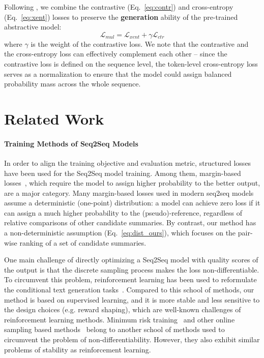\documentclass[11pt]{article}
\begin{document}
Following \citet{edunov-etal-2018-classical}, we combine the contrastive (Eq.~\ref{eq:contr}) and cross-entropy (Eq.~\ref{eq:xent}) losses to preserve the \textbf{generation} ability of the pre-trained abstractive model: 
\begin{equation}
\label{eq:mul}
    \mathcal{L}_{mul} = \mathcal{L}_{xent} + \gamma \mathcal{L}_{ctr}
\end{equation}
where $\gamma$ is the weight of the contrastive loss.
We note that the contrastive and the cross-entropy loss can effectively complement each other -- since the contrastive loss is defined on the sequence level, the token-level cross-entropy loss serves as a normalization to ensure that the model could assign balanced probability mass across the whole sequence. 

\section{Related Work}

\paragraph{Training Methods of Seq2Seq Models}
\label{subsec:training_method}
In order to align the training objective and evaluation metric, structured losses have been used for the Seq2Seq model training. 
Among them, margin-based losses~\citep{ Herbrich99supportvector, NIPS2003_878d5691, gimpel-smith-2010-softmax}, which require the model to assign higher probability to the better output, are a major category.
Many margin-based losses used in modern seq2seq models~\citep{ wiseman-rush-2016-sequence, edunov-etal-2018-classical} assume a deterministic (one-point) distribution: a model can achieve zero loss if it can assign a much higher probability to the (pseudo)-reference, regardless of relative comparisons of other candidate summaries.
By contrast, our method has a non-deterministic assumption (Eq.~\ref{eq:dist_ours}), which focuses on the pair-wise ranking of a set of candidate summaries.

One main challenge of directly optimizing a Seq2Seq model with quality scores of the output is that the discrete sampling process makes the loss non-differentiable. 
To circumvent this problem, reinforcement learning has been used to reformulate the conditional text generation tasks~\citep{ DBLP:journals/corr/RanzatoCAZ15, DBLP:journals/corr/BahdanauBXGLPCB16, li-etal-2016-deep, paulus2018a, li-etal-2019-deep}.
Compared to this school of methods, our method is based on supervised learning, and it is more stable and less sensitive to the design choices (e.g. reward shaping), which are well-known challenges of reinforcement learning methods.
Minimum risk training~\citep{shen-etal-2016-minimum, wieting-etal-2019-beyond} and other online sampling based methods~\citep{10.5555/2969239.2969370, NIPS2016_2f885d0f, zhang-etal-2019-bridging} belong to another school of methods used to circumvent the problem of non-differentiability. However, they also exhibit similar problems of stability as reinforcement learning.
\end{document}

